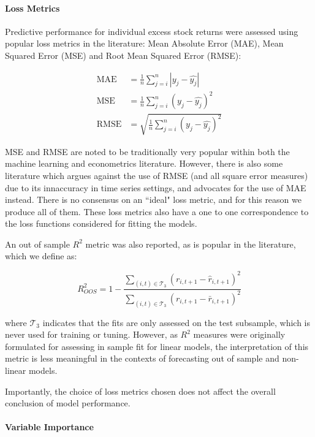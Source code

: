\documentclass[11pt, a4paper, table]{article}
\begin{document}
\paragraph{Loss Metrics}

Predictive performance for individual excess stock returns were assessed using popular loss metrics in the literature: Mean Absolute Error (MAE), Mean Squared Error (MSE) and Root Mean Squared Error (RMSE):

\begin{align}
\text{MAE} &= \frac{1}{n} \sum_{j = i}^{n} |y_j - \hat{y_j}| \\
\text{MSE} &= \frac{1}{n} \sum_{j = i}^{n} \left( y_j - \hat{y_j}\right) ^2 \\
\text{RMSE} &= \sqrt{\frac{1}{n} \sum_{j = i}^{n} \left( y_j - \hat{y_j}\right) ^2}
\end{align}

MSE and RMSE are noted to be traditionally very popular within both the machine learning and econometrics literature. However, there is also some literature which argues against the use of RMSE (and all square error measures) due to its innaccuracy in time series settings, and advocates for the use of MAE instead. There is no consensus on an ``ideal" loss metric, and for this reason we produce all of them. These loss metrics also have a one to one correspondence to the loss functions considered for fitting the models.

An out of sample $R^2$ metric was also reported, as is popular in the literature, which we define as:

\begin{equation}
R^2_{OOS} = 1 - \frac{\sum_{(i, t)\in\mathcal{T}_3}(r_{i, t+1} - \widehat{r}_{i, t+1})^2}
{\sum_{(i, t)\in\mathcal{T}_3} \left( r_{i, t+1} - \bar{r}_{i, t+1} \right) ^2}
\end{equation}

where $\mathcal{T}_3$ indicates that the fits are only assessed on the test subsample, which is never used for training or tuning. However, as $R^2$ measures were originally formulated for assessing in sample fit for linear models, the interpretation of this metric is less meaningful in the contexts of forecasting out of sample and non-linear models.

Importantly, the choice of loss metrics chosen does not affect the overall conclusion of model performance.

\paragraph{Variable Importance}
\end{document}

